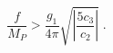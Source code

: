 \begin{equation}
\frac{f}{M_P} > \frac{g_1}{4\pi} \sqrt{\left|\frac{5c_3}{c_2}\right|} \;.
\end{equation}

